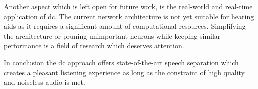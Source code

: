 Another aspect which is left open for future work, is the real-world and real-time application of \acrlong{dc}. The current network architecture is not yet suitable for hearing aids as it requires a significant amount of computational resources. Simplifying the architecture or pruning unimportant neurons while keeping similar performance is a field of research which deserves attention.

In conclusion the \acrlong{dc} approach offers state-of-the-art speech separation which creates a pleasant listening experience as long as the constraint of high quality and noiseless audio is met.







